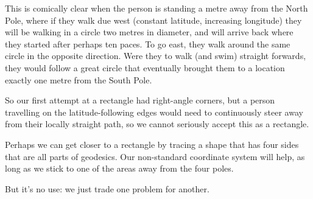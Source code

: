 This is comically clear when the person is standing a metre away from the North Pole, where if they walk due west (constant latitude, increasing longitude) they will be walking in a circle two metres in diameter, and will arrive back where they started after perhaps ten paces. To go east, they walk around the same circle in the opposite direction. Were they to walk (and swim) straight forwards, they would follow a great circle that eventually brought them to a location exactly one metre from the South Pole.

So our first attempt at a rectangle had right-angle corners, but a person travelling on the latitude-following edges would need to continuously steer away from their locally straight path, so we cannot seriously accept this as a rectangle.

Perhaps we can get closer to a rectangle by tracing a shape that has four sides that are all parts of geodesics. Our non-standard coordinate system will help, as long as we stick to one of the areas away from the four poles.

But it's no use: we just trade one problem for another.

